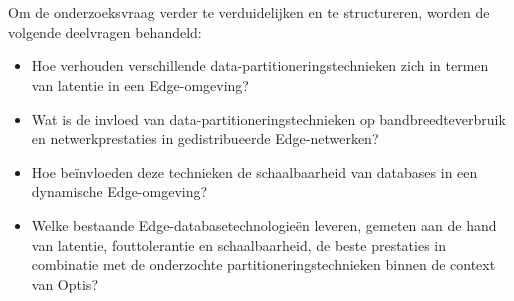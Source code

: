 \section{}%
\label{sec:deelvragen}

Om de onderzoeksvraag verder te verduidelijken en te structureren, worden de volgende deelvragen behandeld:
\begin{itemize}
    \item Hoe verhouden verschillende data-partitioneringstechnieken zich in termen van latentie in een Edge-omgeving?
    \item Wat is de invloed van data-partitioneringstechnieken op bandbreedteverbruik en netwerkprestaties in gedistribueerde Edge-netwerken?
    \item Hoe beïnvloeden deze technieken de schaalbaarheid van databases in een dynamische Edge-omgeving?
    \item Welke bestaande Edge-databasetechnologieën leveren, gemeten aan de hand van latentie, fouttolerantie en schaalbaarheid, de beste prestaties in combinatie met de onderzochte partitioneringstechnieken binnen de context van Optis?
\end{itemize}
